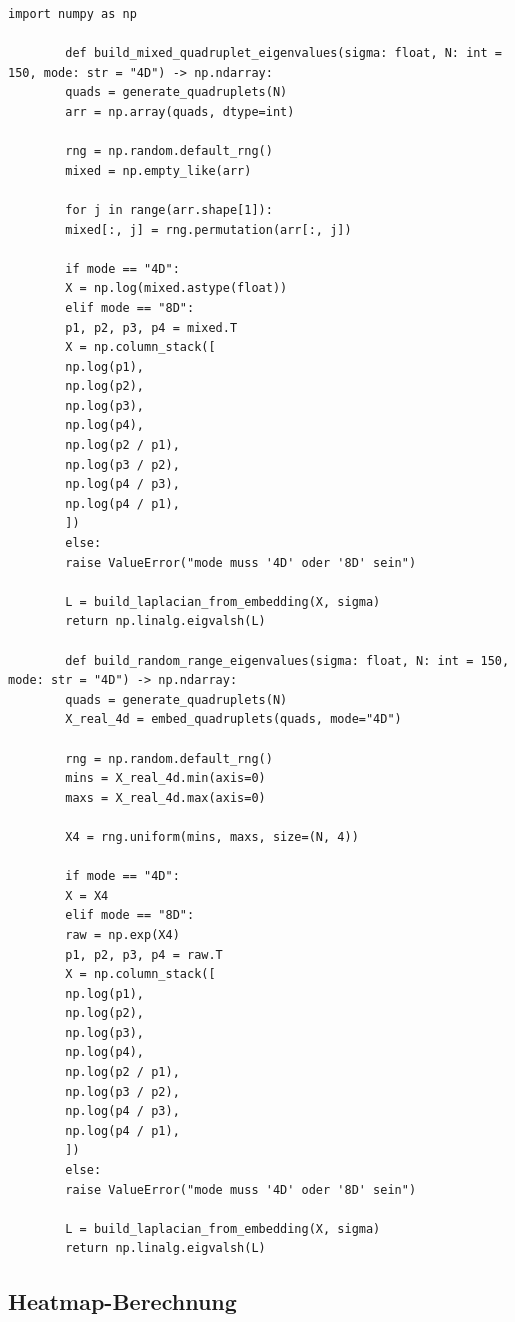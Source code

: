 \documentclass[11pt,a4paper,draft]{article}
\begin{document}
	\begin{lstlisting}[caption={Mixed baseline und random-range baseline.}]
		import numpy as np
		
		def build_mixed_quadruplet_eigenvalues(sigma: float, N: int = 150, mode: str = "4D") -> np.ndarray:
		quads = generate_quadruplets(N)
		arr = np.array(quads, dtype=int)
		
		rng = np.random.default_rng()
		mixed = np.empty_like(arr)
		
		for j in range(arr.shape[1]):
		mixed[:, j] = rng.permutation(arr[:, j])
		
		if mode == "4D":
		X = np.log(mixed.astype(float))
		elif mode == "8D":
		p1, p2, p3, p4 = mixed.T
		X = np.column_stack([
		np.log(p1),
		np.log(p2),
		np.log(p3),
		np.log(p4),
		np.log(p2 / p1),
		np.log(p3 / p2),
		np.log(p4 / p3),
		np.log(p4 / p1),
		])
		else:
		raise ValueError("mode muss '4D' oder '8D' sein")
		
		L = build_laplacian_from_embedding(X, sigma)
		return np.linalg.eigvalsh(L)
		
		def build_random_range_eigenvalues(sigma: float, N: int = 150, mode: str = "4D") -> np.ndarray:
		quads = generate_quadruplets(N)
		X_real_4d = embed_quadruplets(quads, mode="4D")
		
		rng = np.random.default_rng()
		mins = X_real_4d.min(axis=0)
		maxs = X_real_4d.max(axis=0)
		
		X4 = rng.uniform(mins, maxs, size=(N, 4))
		
		if mode == "4D":
		X = X4
		elif mode == "8D":
		raw = np.exp(X4)
		p1, p2, p3, p4 = raw.T
		X = np.column_stack([
		np.log(p1),
		np.log(p2),
		np.log(p3),
		np.log(p4),
		np.log(p2 / p1),
		np.log(p3 / p2),
		np.log(p4 / p3),
		np.log(p4 / p1),
		])
		else:
		raise ValueError("mode muss '4D' oder '8D' sein")
		
		L = build_laplacian_from_embedding(X, sigma)
		return np.linalg.eigvalsh(L)
	\end{lstlisting}
	
	\subsection{Heatmap-Berechnung}
	
\end{document}
